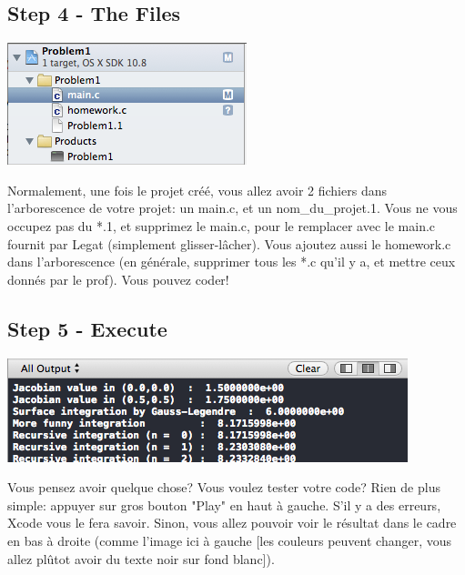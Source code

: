 \documentclass[11pt,a4paper]{article}
\begin{document}
\subsection{Step 4 - The Files}
\begin{minipage}[c]{.40\linewidth}
\includegraphics[width=\linewidth]{files.png}
\end{minipage} \hfill
\begin{minipage}[c]{.50\linewidth}
Normalement, une fois le projet créé, vous allez avoir 2 fichiers dans l'arborescence de votre projet: un main.c, et un nom\_du\_projet.1. Vous ne vous occupez pas du *.1, et supprimez le main.c, pour le remplacer avec le main.c fournit par Legat (simplement glisser-lâcher). Vous ajoutez aussi le homework.c dans l'arborescence (en générale, supprimer tous les *.c qu'il y a, et mettre ceux donnés par le prof). Vous pouvez coder!
\end{minipage}


\subsection{Step 5 - Execute}
\begin{minipage}[c]{.40\linewidth}
\includegraphics[width=\linewidth]{execute.png}
\end{minipage} \hfill
\begin{minipage}[c]{.50\linewidth}
Vous pensez avoir quelque chose? Vous voulez tester votre code? Rien de plus simple: appuyer sur gros bouton "Play" en haut à gauche. S'il y a des erreurs, Xcode vous le fera savoir. Sinon, vous allez pouvoir voir le résultat dans le cadre en bas à droite (comme l'image ici à gauche [les couleurs peuvent changer, vous allez plûtot avoir du texte noir sur fond blanc]).
\end{minipage}
\end{document}
